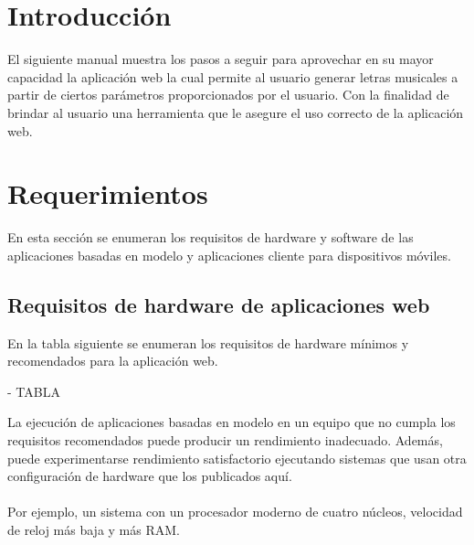 \documentclass[12pt, a4paper, titlepage]{article}
\begin{document}
	\newpage
	\renewcommand\appendixpagename{Índice}
	\renewcommand\appendixtocname{Índice}
	\appendixpageoff
	\begin{appendices}
		\renewcommand*\contentsname{{\textcolor{azulescom}{Índice.}}}
		\tableofcontents
		\newpage
		\renewcommand*\listfigurename{{\textcolor{azulescom}{Índice de figuras.}}}
		\listoffigures
		\newpage
		\newpage
	\end{appendices}
	
	\section{Introducción}
	El siguiente manual muestra los pasos a seguir para aprovechar
	en su mayor capacidad la aplicación web la cual permite al usuario
	generar letras musicales a partir de ciertos parámetros proporcionados
	por el usuario. Con la finalidad de brindar al usuario una herramienta
	que le asegure el uso correcto de la aplicación web.
	
	\section{Requerimientos}
	En esta sección se enumeran los requisitos de hardware y
	software de las aplicaciones basadas en modelo y
	aplicaciones cliente para dispositivos móviles.
	
		\subsection{Requisitos de hardware de aplicaciones web}
			En la tabla siguiente se enumeran los requisitos
			de hardware mínimos y recomendados para la aplicación web.
		
			- TABLA
			
			La ejecución de aplicaciones basadas en modelo en un equipo
			que no cumpla los requisitos recomendados puede producir un
			rendimiento inadecuado. Además, puede experimentarse
			rendimiento satisfactorio ejecutando sistemas que usan otra
			configuración de hardware que los publicados aquí.\\\\
			Por ejemplo, un sistema con un procesador moderno
			de cuatro núcleos, velocidad de reloj más baja y más RAM.
		
\end{document}
